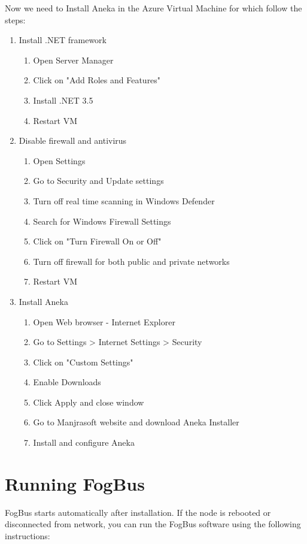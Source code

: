 \documentclass{article}
\begin{document}
Now we need to Install Aneka in the Azure Virtual Machine for which follow the steps:
\begin{enumerate}
\item Install .NET framework
\begin{enumerate}
\item Open Server Manager
\item Click on "Add Roles and Features"
\item Install .NET 3.5
\item Restart VM
\end{enumerate}
\item Disable firewall and antivirus 
\begin{enumerate}
\item Open Settings
\item Go to Security and Update settings
\item Turn off real time scanning in Windows Defender
\item Search for Windows Firewall Settings
\item Click on "Turn Firewall On or Off"
\item Turn off firewall for both public and private networks
\item Restart VM
\end{enumerate}
\item Install Aneka
\begin{enumerate}
\item Open Web browser - Internet Explorer
\item Go to Settings > Internet Settings > Security
\item Click on "Custom Settings"
\item Enable Downloads
\item Click Apply and close window
\item Go to Manjrasoft website and download Aneka Installer
\item Install and configure Aneka
\end{enumerate}
\end{enumerate}

\newpage

\section{Running FogBus}

FogBus starts automatically after installation. If the node is rebooted or disconnected from network, you can run the FogBus software using the following instructions:
\end{document}
